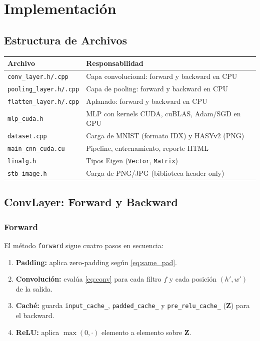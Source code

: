 \documentclass[12pt,a4paper]{article}
\begin{document}
\section{Implementación}

\subsection{Estructura de Archivos}

\begin{center}
\begin{tabular}{ll}
\toprule
\textbf{Archivo}                & \textbf{Responsabilidad} \\
\midrule
\texttt{conv\_layer.h/.cpp}     & Capa convolucional: forward y backward en CPU \\
\texttt{pooling\_layer.h/.cpp}  & Capa de pooling: forward y backward en CPU \\
\texttt{flatten\_layer.h/.cpp}  & Aplanado: forward y backward en CPU \\
\texttt{mlp\_cuda.h}            & MLP con kernels CUDA, cuBLAS, Adam/SGD en GPU \\
\texttt{dataset.cpp}            & Carga de MNIST (formato IDX) y HASYv2 (PNG) \\
\texttt{main\_cnn\_cuda.cu}     & Pipeline, entrenamiento, reporte HTML \\
\texttt{linalg.h}               & Tipos Eigen (\texttt{Vector}, \texttt{Matrix}) \\
\texttt{stb\_image.h}           & Carga de PNG/JPG (biblioteca header-only) \\
\bottomrule
\end{tabular}
\end{center}

\subsection{ConvLayer: Forward y Backward}

\subsubsection{Forward}

El método \texttt{forward} sigue cuatro pasos en secuencia:

\begin{enumerate}[noitemsep]
  \item \textbf{Padding:} aplica zero-padding según \eqref{eq:same_pad}.
  \item \textbf{Convolución:} evalúa \eqref{eq:conv} para cada filtro $f$ y cada
    posición $(h', w')$ de la salida.
  \item \textbf{Caché:} guarda \texttt{input\_cache\_}, \texttt{padded\_cache\_}
    y \texttt{pre\_relu\_cache\_} ($\mathbf{Z}$) para el backward.
  \item \textbf{ReLU:} aplica $\max(0, \cdot)$ elemento a elemento sobre $\mathbf{Z}$.
\end{enumerate}
\end{document}
